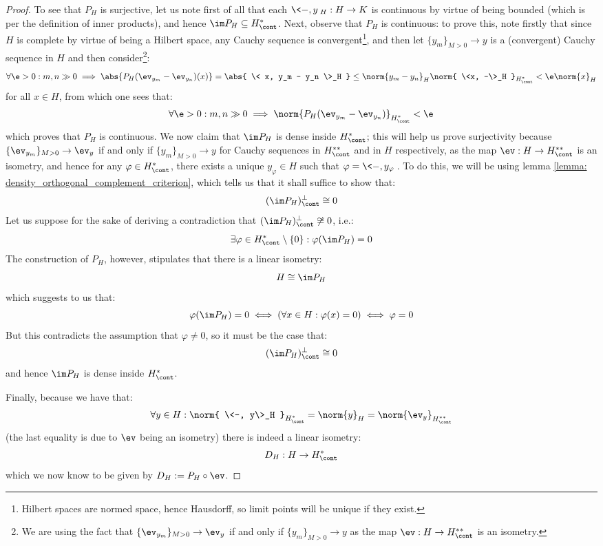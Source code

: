 \begin{proof}
                To see that $P_H$ is surjective, let us note first of all that each $\<-, y\>_H: H \to K$ is continuous by virtue of being bounded (which is per the definition of inner products), and hence $\im P_H \subseteq H^*_{\cont}$. Next, observe that $P_H$ is continuous: to prove this, note firstly that since $H$ is complete by virtue of being a Hilbert space, any Cauchy sequence is convergent\footnote{Hilbert spaces are normed space, hence Hausdorff, so limit points will be unique if they exist.}, and then let $\{y_m\}_{M > 0} \to y$ is a (convergent) Cauchy sequence in $H$ and then consider\footnote{We are using the fact that $\{\ev_{y_m}\}_{M > 0} \to \ev_y$ if and only if $\{y_m\}_{M > 0} \to y$ as the map $\ev: H \to H^{**}_{\cont}$ is an isometry.}:
                    $$\forall \e > 0: m, n \gg 0 \implies \abs{P_H(\ev_{y_m} - \ev_{y_n})(x)} = \abs{ \< x, y_m - y_n \>_H } \leq \norm{y_m - y_n}_H \norm{ \<x, -\>_H }_{H^*_{\cont}} < \e \norm{x}_H$$
                for all $x \in H$, from which one sees that:
                    $$\forall \e > 0: m, n \gg 0 \implies \norm{ P_H(\ev_{y_m} - \ev_{y_n}) }_{H^*_{\cont}} < \e$$
                which proves that $P_H$ is continuous. We now claim that $\im P_H$ is dense inside $H^*_{\cont}$; this will help us prove surjectivity because $\{\ev_{y_m}\}_{M > 0} \to \ev_y$ if and only if $\{y_m\}_{M > 0} \to y$ for Cauchy sequences in $H^{**}_{\cont}$ and in $H$ respectively, as the map $\ev: H \to H^{**}_{\cont}$ is an isometry, and hence for any $\varphi \in H^*_{\cont}$, there exists a unique $y_{\varphi} \in H$ such that $\varphi = \<-, y_{\varphi}\>$. To do this, we will be using lemma \ref{lemma: density_orthogonal_complement_criterion}, which tells us that it shall suffice to show that:
                    $$(\im P_H)^{\perp}_{\cont} \cong 0$$
                Let us suppose for the sake of deriving a contradiction that $(\im P_H)^{\perp}_{\cont} \not \cong 0$, i.e.:
                    $$\exists \varphi \in H^*_{\cont} \setminus \{0\}: \varphi(\im P_H) = 0$$
                The construction of $P_H$, however, stipulates that there is a linear isometry:
                    $$H \cong \im P_H$$
                which suggests to us that:
                    $$\varphi(\im P_H) = 0 \iff (\forall x \in H: \varphi(x) = 0) \iff \varphi = 0$$
                But this contradicts the assumption that $\varphi \not = 0$, so it must be the case that:
                    $$(\im P_H)^{\perp}_{\cont} \cong 0$$
                and hence $\im P_H$ is dense inside $H^*_{\cont}$.

                Finally, because we have that:
                    $$\forall y \in H: \norm{ \<-, y\>_H }_{H^*_{\cont}} = \norm{y}_H = \norm{\ev_y}_{H^{**}_{\cont}}$$
                (the last equality is due to $\ev$ being an isometry) there is indeed a linear isometry:
                    $$D_H: H \to H^*_{\cont}$$
                which we now know to be given by $D_H := P_H \circ \ev$. 
            \end{proof}
